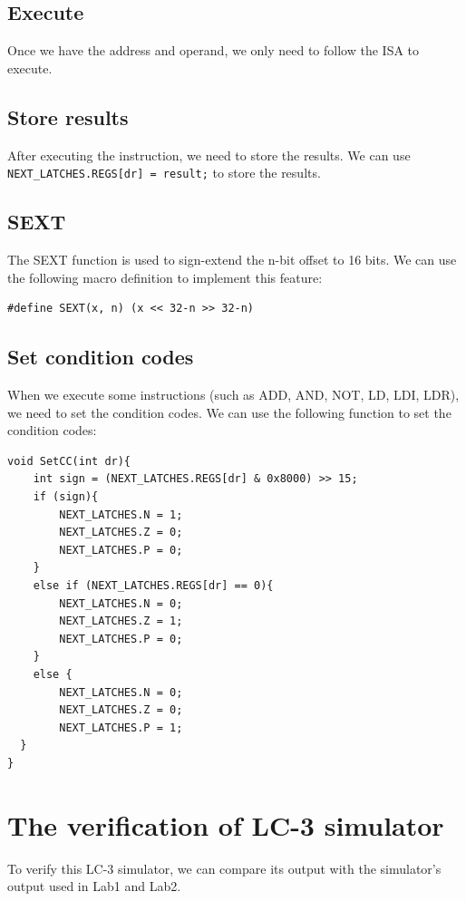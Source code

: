 \documentclass[UTF8,a4paper,12pt]{ctexart}
\begin{document}
\subsection{Execute}
Once we have the address and operand, we only need to follow the ISA to execute.

\subsection{Store results}
After executing the instruction, we need to store the results. We can use\\
\verb|NEXT_LATCHES.REGS[dr] = result;| to store the results.

\subsection{SEXT}
The SEXT function is used to sign-extend the n-bit offset to 16 bits. We can use the following macro definition to implement this feature:

\begin{lstlisting}
#define SEXT(x, n) (x << 32-n >> 32-n)
\end{lstlisting}

\subsection{Set condition codes}
When we execute some instructions (such as ADD, AND, NOT, LD, LDI, LDR), we need to set the condition codes. We can use the following function to set the condition codes:

\begin{lstlisting}
void SetCC(int dr){
    int sign = (NEXT_LATCHES.REGS[dr] & 0x8000) >> 15;
    if (sign){
        NEXT_LATCHES.N = 1;
        NEXT_LATCHES.Z = 0;
        NEXT_LATCHES.P = 0;
    }
    else if (NEXT_LATCHES.REGS[dr] == 0){
        NEXT_LATCHES.N = 0;
        NEXT_LATCHES.Z = 1;
        NEXT_LATCHES.P = 0;
    }
    else {
        NEXT_LATCHES.N = 0;
        NEXT_LATCHES.Z = 0;
        NEXT_LATCHES.P = 1;
  }
}
\end{lstlisting}

\section{The verification of LC-3 simulator}

To verify this LC-3 simulator, we can compare its output with the simulator's output used in Lab1 and Lab2.
\end{document}
